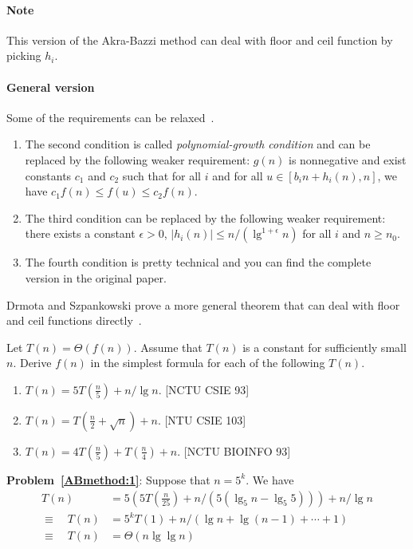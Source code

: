 \begin{refsection}
\paragraph{Note} This version of the Akra\--Bazzi method can deal with floor and ceil function by picking $h_i$.

\paragraph{General version}
Some of the requirements can be relaxed~\cite{Leighton1996}.
\begin{enumerate}
\item The second condition is called {\em polynomial-growth condition} and can be replaced by the following weaker requirement: $g(n)$ is nonnegative and exist constants $c_1$ and $c_2$ such that for all $i$ and for all $u \in [b_in + h_i(n), n]$, we have $c_1f(n) \leq f(u) \leq c_2 f(n)$.
\item The third condition can be replaced by the following weaker requirement: there exists a constant $\epsilon > 0$, $|h_i(n)| \leq n / (\lg^{1 + \epsilon} n)$ for all $i$ and $n \geq n_0$.
\item The fourth condition is pretty technical and you can find the complete version in the original paper.
\end{enumerate}
Drmota and Szpankowski prove a more general theorem that can deal with floor and ceil functions directly~\cite{Drmota2013}.
\begin{Exercise}
Let $T(n) = \Theta(f(n))$. Assume that $T(n)$ is a constant for sufficiently small $n$. Derive $f(n)$ in the simplest formula for each of the following $T(n)$.
\begin{enumerate}
\item $T(n) = 5T(\frac{n}{5}) + n/\lg n$. \label{ABmethod:1}[NCTU CSIE 93]
\item $T(n) = T(\frac{n}{2} + \sqrt{n}) + n$. \label{ABmethod:2} [NTU CSIE 103]
\item $T(n) = 4T(\frac{n}{5}) + T(\frac{n}{4}) + n$. \label{ABmethod:3} [NCTU BIOINFO 93]
\end{enumerate}
\end{Exercise}
\begin{Answer}
{\bf Problem~\ref{ABmethod:1}}: Suppose that $n = 5^k$. We have
\begin{align*}
 T(n)  & = 5(5T(\frac{n}{25}) + n/(5(\lg_5 n - \lg_5 5))) + n/\lg n \\
\equiv \quad T(n) & = 5^kT(1) + n/(\lg n + \lg (n-1) + \cdots + 1) \\
\equiv  \quad T(n) &=  \Theta(n \lg \lg n) \\
\end{align*}


\end{Answer}
\end{refsection}
